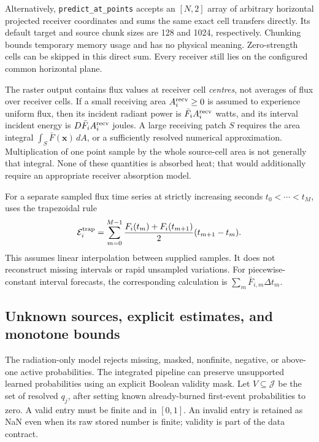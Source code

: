 \documentclass[11pt,a4paper]{article}
\begin{document}
Alternatively, \texttt{predict\_at\_points} accepts an $[N,2]$ array of
arbitrary horizontal projected receiver coordinates and sums the same exact
cell transfers directly. Its default target and source chunk sizes are
128 and 1024, respectively. Chunking bounds temporary memory usage and has
no physical meaning. Zero-strength cells can be skipped in this direct sum.
Every receiver still lies on the configured common horizontal plane.

The raster output contains flux values at receiver cell \emph{centres}, not
averages of flux over receiver cells. If a small receiving area
$A_i^{\rm recv}\ge0$ is assumed to experience uniform flux, then its
incident radiant power is $\bar F_iA_i^{\rm recv}$ watts, and its
interval incident energy is $D\bar F_iA_i^{\rm recv}$ joules. A large
receiving patch $S$ requires the area integral
$\int_S\bar F(\mathbf x)\,dA$, or a sufficiently resolved numerical
approximation. Multiplication of one point sample by the whole source-cell
area is not generally that integral. None of these quantities is absorbed
heat; that would additionally require an appropriate receiver absorption
model.

For a separate sampled flux time series at strictly increasing seconds
$t_0<\cdots<t_M$,  uses the trapezoidal rule
\begin{equation}
 \mathcal E_i^{\rm trap}
 =\sum_{m=0}^{M-1}\frac{F_i(t_m)+F_i(t_{m+1})}{2}(t_{m+1}-t_m).
\end{equation}
This assumes linear interpolation between supplied samples. It does not
reconstruct missing intervals or rapid unsampled variations. For
piecewise-constant interval forecasts, the corresponding calculation is
$\sum_m\bar F_{i,m}\Delta t_m$.

\subsection{Unknown sources, explicit estimates, and monotone bounds}
\label{sec:heat-bounds}

The radiation-only model rejects missing, masked, nonfinite, negative, or
above-one active probabilities. The integrated pipeline can preserve
unsupported learned probabilities using an explicit Boolean validity mask.
Let $V\subseteq\mathcal J$ be the set of resolved $q_j$, after setting
known already-burned first-event probabilities to zero. A valid entry must
be finite and in $[0,1]$. An invalid entry is retained as NaN even when its
raw stored number is finite; validity is part of the data contract.
\end{document}
